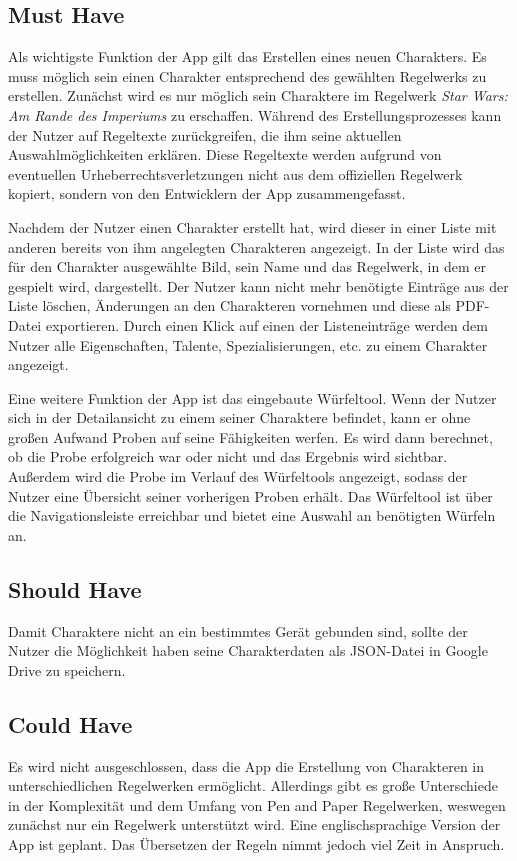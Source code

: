 \subsection{Must Have}
Als wichtigste Funktion der App gilt das Erstellen eines neuen Charakters. Es muss möglich sein einen Charakter entsprechend des gewählten Regelwerks zu erstellen. Zunächst wird es nur möglich sein Charaktere im Regelwerk \textit{Star Wars: Am Rande des Imperiums} zu erschaffen. Während des Erstellungsprozesses kann der Nutzer auf Regeltexte zurückgreifen, die ihm seine aktuellen Auswahlmöglichkeiten erklären. Diese Regeltexte werden aufgrund von eventuellen Urheberrechtsverletzungen nicht aus dem offiziellen Regelwerk kopiert, sondern von den Entwicklern der App zusammengefasst.

Nachdem der Nutzer einen Charakter erstellt hat, wird dieser in einer Liste mit anderen bereits von ihm angelegten Charakteren angezeigt. In der Liste wird das für den Charakter ausgewählte Bild, sein Name und das Regelwerk, in dem er gespielt wird, dargestellt. Der Nutzer kann nicht mehr benötigte Einträge aus der Liste löschen, Änderungen an den Charakteren vornehmen und diese als PDF-Datei exportieren. Durch einen Klick auf einen der Listeneinträge werden dem Nutzer alle Eigenschaften, Talente, Spezialisierungen, etc. zu einem Charakter angezeigt.

Eine weitere Funktion der App ist das eingebaute Würfeltool. Wenn der Nutzer sich in der Detailansicht zu einem seiner Charaktere befindet, kann er ohne großen Aufwand Proben auf seine Fähigkeiten werfen. Es wird dann berechnet, ob die Probe erfolgreich war oder nicht und das Ergebnis wird sichtbar. Außerdem wird die Probe im Verlauf des Würfeltools angezeigt, sodass der Nutzer eine Übersicht seiner vorherigen Proben erhält. Das Würfeltool ist über die Navigationsleiste erreichbar und bietet eine Auswahl an benötigten Würfeln an.

\subsection{Should Have}
Damit Charaktere nicht an ein bestimmtes Gerät gebunden sind, sollte der Nutzer die Möglichkeit haben seine Charakterdaten als JSON-Datei in Google Drive zu speichern.

\subsection{Could Have}
Es wird nicht ausgeschlossen, dass die App die Erstellung von Charakteren in unterschiedlichen Regelwerken ermöglicht. Allerdings gibt es große Unterschiede in der Komplexität und dem Umfang von Pen and Paper Regelwerken, weswegen zunächst nur ein Regelwerk unterstützt wird. Eine englischsprachige Version der App ist geplant. Das Übersetzen der Regeln nimmt jedoch viel Zeit in Anspruch.

